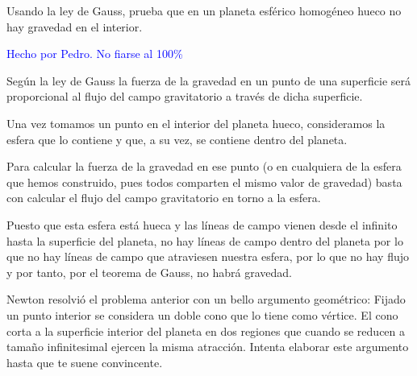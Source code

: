 \begin{problem}[10]
Usando la ley de Gauss, prueba que en un planeta esférico homogéneo hueco no hay gravedad en el interior.
\solution

\textcolor{blue}{Hecho por Pedro. No fiarse al 100\%}

Según la ley de Gauss la fuerza de la gravedad en un punto de una superficie será proporcional al flujo del campo gravitatorio a través de dicha superficie.

Una vez tomamos un punto en el interior del planeta hueco, consideramos la esfera que lo contiene y que, a su vez, se contiene dentro del planeta.

Para calcular la fuerza de la gravedad en ese punto (o en cualquiera de la esfera que hemos construido, pues todos comparten el mismo valor de gravedad) basta con calcular el flujo del campo gravitatorio en torno a la esfera.

Puesto que esta esfera está hueca y las líneas de campo vienen desde el infinito hasta la superficie del planeta, no hay líneas de campo dentro del planeta por lo que no hay líneas de campo que atraviesen nuestra esfera, por lo que no hay flujo y por tanto, por el teorema de Gauss, no habrá gravedad.
\end{problem}

\begin{problem}[11]
Newton resolvió el problema anterior con un bello argumento geométrico: Fijado un
punto interior se considera un doble cono que lo tiene como vértice. El cono corta a la superficie interior del planeta en dos regiones que cuando se reducen a tamaño infinitesimal ejercen la misma atracción. Intenta elaborar este argumento hasta que te suene convincente.

\solution

\end{problem}

